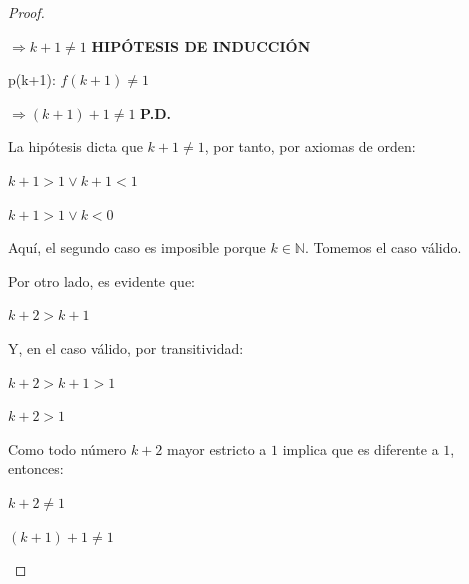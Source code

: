 \documentclass{article}
\begin{document}
\begin{enumerate}
\begin{enumerate}
\begin{enumerate}
\begin{proof}
\begin{enumerate}
                                \(\Rightarrow k+1 \neq 1 \) \textbf{HIPÓTESIS DE INDUCCIÓN}
                                \vspace{\baselineskip}

                                p(k+1): \(f(k + 1) \neq 1\)
                            
                                \(\Rightarrow (k + 1) + 1 \neq 1\) \textbf{P.D.}
                                \vspace{\baselineskip}

                                La hipótesis dicta que \( k+1 \neq 1 \), por tanto, por axiomas de orden:

                                \( k+1 > 1  \lor  k+1 < 1\)
                                
                                \( k+1 > 1 \lor k < 0 \)
                                \vspace{\baselineskip}

                                Aquí, el segundo caso es imposible porque \( k \in \mathbb{N} \). Tomemos el caso válido.
                                \vspace{\baselineskip}
                                
                                Por otro lado, es evidente que:
                                
                                \( k+2 > k+1 \)
                                \vspace{\baselineskip}
                                
                                Y, en el caso válido, por transitividad:
                                
                                \( k+2 > k+1 > 1 \)
                                
                                \( k+2 > 1 \)
                                \vspace{\baselineskip}
                                
                                Como todo número \( k+2 \) mayor estricto a $1$ implica que es diferente a $1$, entonces:
                                
                                \( k+2 \neq 1 \)

                                \((k + 1) + 1 \neq 1\)
                                \vspace{\baselineskip}
                                

\end{enumerate}
\end{proof}
\end{enumerate}
\end{enumerate}
\end{enumerate}
\end{document}
